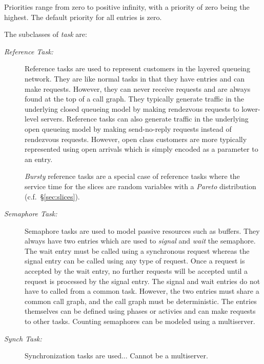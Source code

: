 Priorities range from zero to positive
infinity, with a priority of zero being the highest.  The default
priority for all entries is zero.

The subclasses of \emph{task} are:
\begin{description}
\item[\emph{Reference Task:}] Reference tasks are used to
  represent customers in the layered queueing network.  They are like normal tasks in that
  they have entries and can make requests.  However, they can never receive requests and are always found at
  the top of a call graph.  They typically generate traffic in the underlying closed queueing
  model by making rendezvous requests to
  lower-level servers.  Reference tasks can also generate traffic in the underlying open queueing
  model by making send-no-reply requests instead of rendezvous requests.
  However, open class customers are more typically represented using open arrivals which is simply encoded
  as a parameter to an entry.
  
  \emph{Bursty} reference tasks are
  a special case of reference tasks where the service time for the slices are random variables
  with a \emph{Pareto} distribution (c.f.~\S\ref{sec:slices}).
\item[\emph{Semaphore Task:}] Semaphore tasks are used to
  model passive resources such as buffers.  They always have two entries which are
  used to \emph{signal} and \emph{wait} the
  semaphore.  The wait entry must be called using a synchronous request whereas the signal entry can be
  called using any type of request.  Once a request is accepted by the wait entry, no further requests will
  be accepted until a request is processed by the signal entry.  The signal and wait entries do not have to
  called from a common task.  However, the two entries must share a common call graph, and the call graph
  must be deterministic.  The entries themselves can be defined using phases or activies and can make
  requests to other tasks.  Counting semaphores can be modeled using a
  multiserver.
\item[\emph{Synch Task:}] Synchronization tasks
   are used...  Cannot be a multiserver.
\end{description}



